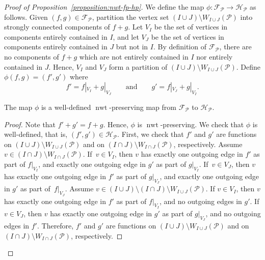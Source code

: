 \documentclass[11pt]{article}
\theoremstyle{definition}
\numberwithin{equation}{section}
\DeclareMathOperator{\normalizedweight}{nwt}
\begin{document}
\begin{proof}[Proof of Proposition~\ref{proposition:nwt-fp-hp}]
We define the map \(\phi \colon \mathcal{F}_{\mathcal{P}} \to \mathcal{H}_{\mathcal{P}}\) as follows.
Given \mbox{\((f, g) \in \mathcal{F}_{\mathcal{P}}\)},
partition the vertex set \((I \cup J) \setminus W_{I \cup J}(\mathcal{P})\) into strongly connected components of \(f+g\).
Let \(V_I\) be the set of vertices in components entirely contained in \(I\), and let \(V_J\) be the set of vertices in components entirely contained in \(J\) but not in \(I\).
By definition of \(\mathcal{F}_{\mathcal{P}}\), there are no components of \(f+g\) which are not entirely contained in \(I\) nor entirely contained in \(J\).
Hence, \(V_I\) and \(V_J\) form a partition of \((I \cup J) \setminus W_{I \cup J}(\mathcal{P})\).
Define \(\phi(f, g) = (f', g')\) where
\begin{equation*}
    f' = f|_{V_I} + g|_{V_J} \qquad \text{and} \qquad g' = f|_{V_J} + g|_{V_I}.
\end{equation*}

\begin{claim} \label{claim:phi-well-defined}
    The map \(\phi\) is a well-defined \(\normalizedweight\)-preserving map from \(\mathcal{F}_{\mathcal{P}}\) to \(\mathcal{H}_{\mathcal{P}}\).
\end{claim}

\begin{proof}
Note that \(f' + g' = f + g\).
Hence, \(\phi\) is \(\normalizedweight\)-preserving.
We check that \(\phi\) is well-defined, that is, \((f', g') \in \mathcal{H}_{\mathcal{P}}\).
First, we check that \(f'\) and \(g'\) are functions on \((I \cup J) \setminus W_{I \cup J}(\mathcal{P})\) and on \((I \cap J) \setminus W_{I \cap J}(\mathcal{P})\), respectively.
Assume \(v \in (I \cap J) \setminus W_{I \cap J}(\mathcal{P})\).
If~\(v \in V_I\), then \(v\) has exactly one outgoing edge in \(f'\) as part of \(f|_{V_I}\), 
and exactly one outgoing edge in \(g'\) as part of \(g|_{V_I}\).
If~\(v \in V_J\), then \(v\) has exactly one outgoing edge in \(f'\) as part of \(g|_{V_J}\),
and exactly one outgoing edge in \(g'\) as part of~\(f|_{V_J}\).
Assume \(v \in (I \cup J) \setminus (I \cap J) \setminus W_{I \cup J}(\mathcal{P})\).
If \(v \in V_I\), then \(v\) has exactly one outgoing edge in \(f'\) as part of \(f|_{V_I}\), and no outgoing edges in \(g'\).
If \(v \in V_J\), then \(v\) has exactly one outgoing edge in \(g'\) as part of \(g|_{V_J}\), and no outgoing edges in \(f'\).
Therefore, \(f'\) and \(g'\) are functions on \((I \cup J) \setminus W_{I \cup J}(\mathcal{P})\) and on \((I \cap J) \setminus W_{I \cap J}(\mathcal{P})\), respectively.


\end{proof}
\end{proof}
\end{document}
